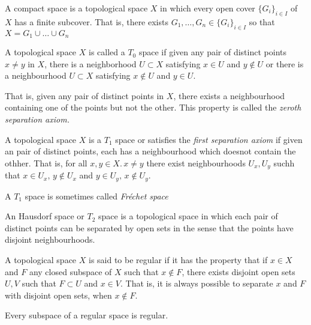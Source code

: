 \begin{defn}
    A compact space is a topological space $X$ in which every open cover $\{G_i\}_{i \in I}$ of $X$ has a finite subcover. That is, there exists $G_1, \ldots, G_n \in \{G_i\}_{i \in I}$ so that $X  = G_1 \cup \ldots \cup G_n$ 
\end{defn}

\begin{defn}
    A topological space $X$ is called a $T_0$ space if given any pair of distinct points $x \neq y$ in $X$, there is a neighborhood $U \subset X$ satisfying $x \in U$ and $y \notin U$ or there is a neighbourhood $U \subset X$ satisfying $x \notin U$ and $y \in U$.

    That is, given any pair of distinct points in $X$, there exists a neighbourhood containing one of the points but not the other. This property is called the \textit{zeroth separation axiom.} 
\end{defn}

\begin{defn}
    A topological space $X$ is a $T_1$ space or satisfies the \textit{first separation axiom} if given an pair of distinct points, each has a neighbourhood which doesnot contain the othher. That is, for all $x,y \in X. \, x \neq y$ there exist neighbourhoods $U_x, U_y$ suchh that $x \in U_x, \, y \notin U_x$ and $y \in U_y, \, x \notin U_y$.

    A $T_1$ space is sometimes called \textit{Fr\'echet space} 
\end{defn}

\begin{defn}
    An Hausdorf space or $T_2$ space is a topological space in which each pair of distinct points can be separated by open sets in the sense that the points have disjoint neighbourhoods.
\end{defn}

\begin{defn}
    A topological space $X$ is said to be regular if it has the property that if $x \in X$ and $F$ any closed subspace of $X$ such that $x \notin F$, there exists disjoint open sets $U,V$ such that $F \subset U$ and $x \in V$. That is, it is always possible to separate $x$ and $F$ with disjoint open sets, when $x \notin F$.
\end{defn}

\begin{prop}
    Every subspace of a regular space is regular.
\end{prop}

